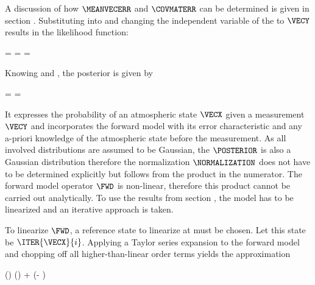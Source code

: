     A discussion of how $\MEANVECERR$ and $\COVMATERR$ can be determined is
    given in section . Substituting 
    into  and changing the independent variable of
    the {\PDF} to $\VECY$ results in the likelihood function:
    
    \placesubformula
    \startformula
    \startalign[n=3,align={right,middle,left}]
        \NC \PROB{\VECY - \FWD(\VECX)} = \NC
            \GAUSS{\VECY - \FWD(\VECX)}{\MEANVECERR}{\COVMATERR} \NC \NR
        \NC = \NC \GAUSS{\VECY}{\FWD(\VECX)+\MEANVECERR}{\COVMATERR} \NC
            = \LIKELIHOOD \EQSTOP {}
    \stopalign
    \stopformula

    Knowing  and , the
    posterior {\PDF} is given by

    \startformula
        \POSTERIOR
        = \frac{\LIKELIHOOD \PRIOR}{\NORMALIZATION}
        = \frac{\GAUSS{\VECY}{\FWD(\VECX) + \MEANVECERR}{\COVMATERR}
            ~\GAUSS{\VECX}{\MEANVECA}{\COVMATA}}{\NORMALIZATION} \EQSTOP
    \stopformula

    It expresses the probability of an atmospheric state $\VECX$ given a
    measurement $\VECY$ and incorporates the forward model with its error
    characteristic and any a-priori knowledge of the atmospheric state before
    the measurement. As all involved distributions are assumed to be Gaussian,
    the $\POSTERIOR$ is also a Gaussian distribution therefore the
    normalization $\NORMALIZATION$ does not have to be determined explicitly
    but follows from the product in the numerator. The forward model operator
    $\FWD$ is non-linear, therefore this product cannot be carried out
    analytically. To use the results from section , the
    model has to be linearized and an iterative approach is taken.

    \startsubsection[title=Iterative Solutions]

        To linearize $\FWD$, a reference state to linearize at must be chosen.
        Let this state be $\ITER{\VECX}{i}$. Applying a Taylor series
        expansion to the forward model and chopping off all higher-than-linear
        order terms yields the approximation

        \startformula
            \FWD(\VECX) \approx \FWD()
                +  (\VECX - ) \EQSTOP
        \stopformula

